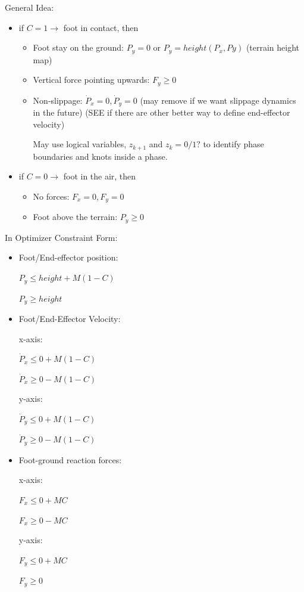 \documentclass[a4paper,10pt]{article}
\begin{document}
General Idea:

\begin{itemize}
	\item if $C = 1 \rightarrow $ foot in contact, then
		
		\begin{itemize}
			\item Foot stay on the ground: $P_y = 0$ or $P_y = height(P_x,Py)$ (terrain height map)
			\item Vertical force pointing upwards: $F_y \geq 0$
			\item Non-slippage: $\dot{P}_x = 0, \dot{P}_y =0$ (may remove if we want slippage dynamics in the future) (SEE if there are other better way to define end-effector velocity)
			
			May use logical variables, $z_{k+1}$ and $z_{k} = 0/1?$ to identify phase boundaries and knots inside a phase.
		\end{itemize}
	
	\item if $C =0 \rightarrow $ foot in the air, then
	
		\begin{itemize}
			\item No forces: $F_x = 0, F_y =0$
			\item Foot above the terrain: $P_y \geq 0$
		\end{itemize}
\end{itemize}

In Optimizer Constraint Form:

\begin{itemize}
	\item Foot/End-effector position:
	
	$P_y \leq height + M(1-C)$
	
	$P_y \geq height$
	
	\item Foot/End-Effector Velocity:
	
	x-axis:
	
	$\dot{P}_x \leq 0 + M(1-C)$
	
	$\dot{P}_x \geq 0 - M(1-C)$
	
	y-axis:
	
	$\dot{P}_y \leq 0 + M(1-C)$
	
	$\dot{P}_y \geq 0 - M(1-C)$
	
	\item Foot-ground reaction forces:
	
	x-axis:
	
	$F_x \leq 0 + MC$
	
	$F_x \geq 0 - MC$
	
	y-axis:
	
	$F_y \leq 0 + MC$
	
	$F_y \geq 0$
	
\end{itemize}
\end{document}
